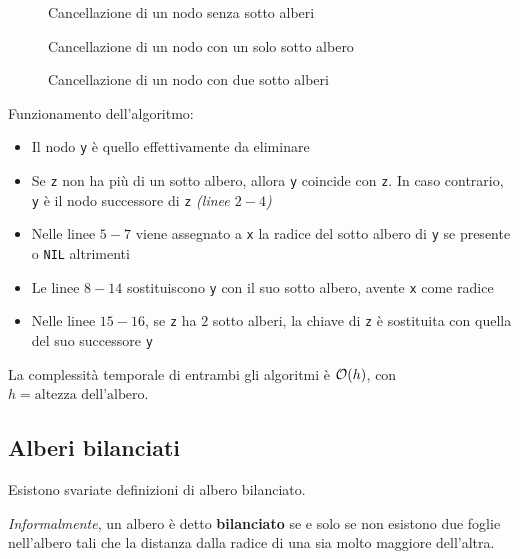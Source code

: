 \documentclass[italian, 10pt]{article}
\begin{document}
\begin{figure}[htbp]
  \bigskip
  \centering
  \caption{Cancellazione di un nodo senza sotto alberi}
  \label{fig:cancellazione-nodo-bst-senza-sotto-alberi}
  \bigskip
\end{figure}

\begin{figure}[htbp]
  \bigskip
  \centering
  \caption{Cancellazione di un nodo con un solo sotto albero}
  \label{fig:cancellazione-nodo-bst-con-un-solo-sotto-albero}
  \bigskip
\end{figure}

\begin{figure}[htbp]
  \bigskip
  \centering
  \caption{Cancellazione di un nodo con due sotto alberi}
  \label{fig:cancellazione-nodo-bst-con-due-sotto-alberi}
  \bigskip
\end{figure}

Funzionamento dell'algoritmo:

\begin{itemize}
  \item Il nodo \texttt{y} è quello effettivamente da eliminare
  \item Se \texttt{z} non ha più di un sotto albero, allora \texttt{y} coincide con \texttt{z}. In caso contrario, \texttt{y} è il nodo successore di \texttt{z} \textit{(linee \(2-4\))}
  \item Nelle linee \(5-7\) viene assegnato a \texttt{x} la radice del sotto albero di \texttt{y} se presente o \texttt{NIL} altrimenti
  \item Le linee \(8-14\) sostituiscono \texttt{y} con il suo sotto albero, avente \texttt{x} come radice
  \item Nelle linee \(15-16\), se \texttt{z} ha \(2\) sotto alberi, la chiave di \texttt{z} è sostituita con quella del suo successore \texttt{y}
\end{itemize}

\bigskip
La complessità temporale di entrambi gli algoritmi è \(\mathcal{O}(h)\), con \(h = \text{altezza dell'albero}\).

\subsection{Alberi bilanciati}

Esistono svariate definizioni di albero bilanciato.

\textit{Informalmente}, un albero è detto \textbf{bilanciato} se e solo se non esistono due foglie nell'albero tali che la distanza dalla radice di una sia molto maggiore dell'altra.
\end{document}
